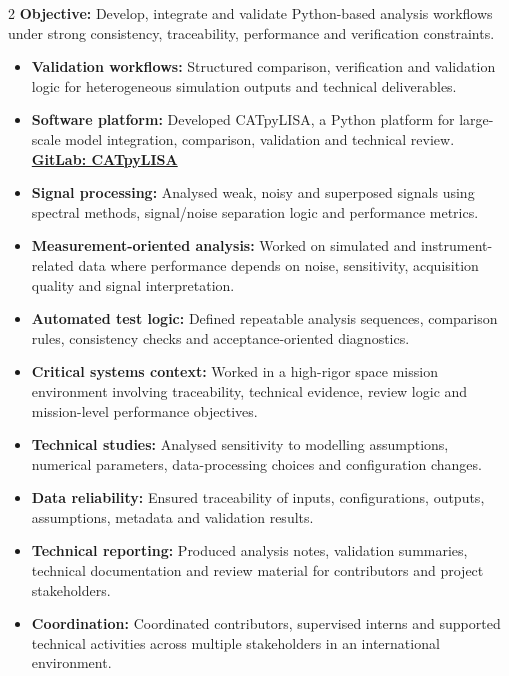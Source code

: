 \documentclass[8pt,a4paper,ragged2e,withhyper]{altacv}
\begin{document}
\begin{paracol}{2}
\textbf{Objective:} Develop, integrate and validate Python-based analysis workflows under strong consistency, traceability, performance and verification constraints.

\begin{itemize}
  \item \textbf{Validation workflows:} Structured comparison, verification and validation logic for heterogeneous simulation outputs and technical deliverables.
  \item \textbf{Software platform:} Developed CATpyLISA, a Python platform for large-scale model integration, comparison, validation and technical review.
  \textcolor{DarkPastelRed}{\href{https://gitlab.oca.eu/gboileau/lisa_l3_tools}{\bf GitLab: CATpyLISA}}
  \item \textbf{Signal processing:} Analysed weak, noisy and superposed signals using spectral methods, signal/noise separation logic and performance metrics.
  \item \textbf{Measurement-oriented analysis:} Worked on simulated and instrument-related data where performance depends on noise, sensitivity, acquisition quality and signal interpretation.
  \item \textbf{Automated test logic:} Defined repeatable analysis sequences, comparison rules, consistency checks and acceptance-oriented diagnostics.
  \item \textbf{Critical systems context:} Worked in a high-rigor space mission environment involving traceability, technical evidence, review logic and mission-level performance objectives.
  \item \textbf{Technical studies:} Analysed sensitivity to modelling assumptions, numerical parameters, data-processing choices and configuration changes.
  \item \textbf{Data reliability:} Ensured traceability of inputs, configurations, outputs, assumptions, metadata and validation results.
  \item \textbf{Technical reporting:} Produced analysis notes, validation summaries, technical documentation and review material for contributors and project stakeholders.
  \item \textbf{Coordination:} Coordinated contributors, supervised interns and supported technical activities across multiple stakeholders in an international environment.
\end{itemize}

\divider



\end{paracol}
\end{document}
